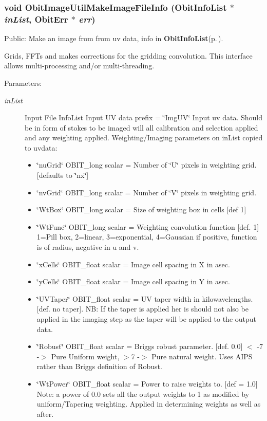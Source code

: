 \subsubsection{\setlength{\rightskip}{0pt plus 5cm}void Obit\-Image\-Util\-Make\-Image\-File\-Info ({\bf Obit\-Info\-List} $\ast$ {\em in\-List}, {\bf Obit\-Err} $\ast$ {\em err})}\label{ObitImageUtil_8h_a4}


Public: Make an image from from uv data, info in {\bf Obit\-Info\-List}{\rm (p.\,\pageref{structObitInfoList})}. 

Grids, FFTs and makes corrections for the gridding convolution. This interface allows multi-processing and/or multi-threading. \begin{Desc}
\item[Parameters:]
\begin{description}
\item[{\em in\-List}]Input File Info\-List Input UV data prefix = \char`\"{}Img\-UV\char`\"{} Input uv data. Should be in form of stokes to be imaged will all calibration and selection applied and any weighting applied. Weighting/Imaging parameters on in\-List copied to uvdata: \begin{itemize}
\item \char`\"{}nu\-Grid\char`\"{} OBIT\_\-long scalar = Number of \char`\"{}U\char`\"{} pixels in weighting grid. [defaults to \char`\"{}nx\char`\"{}] \item \char`\"{}nv\-Grid\char`\"{} OBIT\_\-long scalar = Number of \char`\"{}V\char`\"{} pixels in weighting grid. \item \char`\"{}Wt\-Box\char`\"{} OBIT\_\-long scalar = Size of weighting box in cells [def 1] \item \char`\"{}Wt\-Func\char`\"{} OBIT\_\-long scalar = Weighting convolution function [def. 1] 1=Pill box, 2=linear, 3=exponential, 4=Gaussian if positive, function is of radius, negative in u and v. \item \char`\"{}x\-Cells\char`\"{} OBIT\_\-float scalar = Image cell spacing in X in asec. \item \char`\"{}y\-Cells\char`\"{} OBIT\_\-float scalar = Image cell spacing in Y in asec. \item \char`\"{}UVTaper\char`\"{} OBIT\_\-float scalar = UV taper width in kilowavelengths. [def. no taper]. NB: If the taper is applied her is should not also be applied in the imaging step as the taper will be applied to the output data. \item \char`\"{}Robust\char`\"{} OBIT\_\-float scalar = Briggs robust parameter. [def. 0.0] $<$ -7 -$>$ Pure Uniform weight, $>$7 -$>$ Pure natural weight. Uses AIPS rather than Briggs definition of Robust. \item \char`\"{}Wt\-Power\char`\"{} OBIT\_\-float scalar = Power to raise weights to. [def = 1.0] Note: a power of 0.0 sets all the output weights to 1 as modified by uniform/Tapering weighting. Applied in determining weights as well as after.\end{itemize}

\end{description}
\end{Desc}
